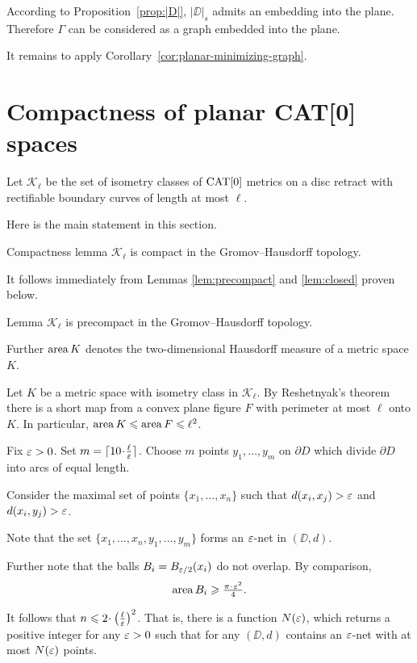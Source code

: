 \documentclass[a4paper,10pt]{amsart}
\begin{document}
According to Proposition~\ref{prop:|D|},
$|\DD|_s$ admits an embedding into the plane.
Therefore $\Gamma$ can be considered as a graph embedded into the plane.

It remains to apply Corollary~\ref{cor:planar-minimizing-graph}.
\qeds

\section{Compactness of planar CAT[0] spaces}

Let $\mathcal{K}_\ell$ be the set of isometry classes of $\mathop{\rm CAT}\nolimits[0]$ metrics on a disc retract with rectifiable
boundary curves of length at most $\ell$.


Here is the main statement in this section.

\begin{thm}{Compactness lemma}\label{lem:compact}
$\mathcal{K}_\ell$ is compact in the Gromov--Hausdorff topology.
\end{thm}

It follows immediately from Lemmas \ref{lem:precompact} and \ref{lem:closed} proven below.

\begin{thm}{Lemma}\label{lem:precompact}
$\mathcal{K}_\ell$ is precompact in the Gromov--Hausdorff topology.
\end{thm}

Further $\mathop{\rm area}\nolimits K$ denotes the two-dimensional Hausdorff measure of a metric space $K$. 

Let $K$ be a metric space with isometry class in $\mathcal {K}_\ell$.
By Reshetnyak's theorem there is a short map from a convex plane figure $F$ with perimeter at most $\ell$ onto $K$.
In particular, $\mathop{\rm area}\nolimits K \leqslant \mathop{\rm area}\nolimits F 
\leqslant \ell^2$.

Fix $\varepsilon>0$. 
Set $m=\lceil 10\cdot\tfrac\ell\eps\rceil$.
Choose $m$ points $y_1,\dots,y_m$ on $\partial D$
which divide $\partial D$ into arcs of equal length.

Consider the maximal set of points $\{x_1,\dots,x_n\}$ such that $d(x_i,x_j)>\varepsilon$ and $d(x_i,y_j)>\varepsilon$.

Note that the set $\{x_1,\dots,x_n,y_1,\dots,y_m\}$
forms an $\varepsilon$-net in $(\DD,d)$.

Further note that the balls $B_i=B_{\varepsilon/2}(x_i)$
do not overlap.
By comparison,
\[\area B_i\ge \tfrac{\pi\cdot\eps^2}{4}.\]

It follows that $n\le 2\cdot\left(\tfrac\ell\eps\right)^2$.
That is, there is a function $N(\varepsilon)$,
which returns a positive integer for any $\varepsilon>0$
such that for any 
$(\DD,d)$ contains an $\varepsilon$-net
with at most $N(\varepsilon)$ points.
\end{document}
